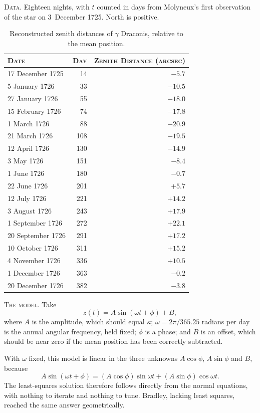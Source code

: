 \textsc{Data.} Eighteen nights, with $t$ counted in days from Molyneux's first observation of the star on 3~December 1725. North is positive.

\begin{table}[htbp]
  \centering
  \caption{Reconstructed zenith distances of $\gamma$ Draconis, relative to the mean position.}
  \label{tab:bradley-raw-data}
  \small
  \begin{tabular}{lrr}
    \toprule
    \textsc{Date} & \textsc{Day} & \textsc{Zenith Distance (arcsec)} \\
    \midrule
    17 December 1725 & 14 & $-5.7$ \\
    5 January 1726 & 33 & $-10.5$ \\
    27 January 1726 & 55 & $-18.0$ \\
    15 February 1726 & 74 & $-17.8$ \\
    1 March 1726 & 88 & $-20.9$ \\
    21 March 1726 & 108 & $-19.5$ \\
    12 April 1726 & 130 & $-14.9$ \\
    3 May 1726 & 151 & $-8.4$ \\
    1 June 1726 & 180 & $-0.7$ \\
    22 June 1726 & 201 & $+5.7$ \\
    12 July 1726 & 221 & $+14.2$ \\
    3 August 1726 & 243 & $+17.9$ \\
    1 September 1726 & 272 & $+22.1$ \\
    20 September 1726 & 291 & $+17.2$ \\
    10 October 1726 & 311 & $+15.2$ \\
    4 November 1726 & 336 & $+10.5$ \\
    1 December 1726 & 363 & $-0.2$ \\
    20 December 1726 & 382 & $-3.8$ \\
    \bottomrule
  \end{tabular}
\end{table}

\textsc{The model.} Take
\[
  z(t) = A \sin(\omega t + \phi) + B,
\]
where $A$ is the amplitude, which should equal $\kappa$; $\omega = 2\pi / 365.25$ radians per day is the annual angular frequency, held fixed; $\phi$ is a phase; and $B$ is an offset, which should be near zero if the mean position has been correctly subtracted.

With $\omega$ fixed, this model is linear in the three unknowns $A\cos\phi$, $A\sin\phi$ and $B$, because
\[
  A \sin(\omega t + \phi) = (A\cos\phi)\sin\omega t + (A\sin\phi)\cos\omega t.
\]
The least-squares solution therefore follows directly from the normal equations, with nothing to iterate and nothing to tune. Bradley, lacking least squares, reached the same answer geometrically.


